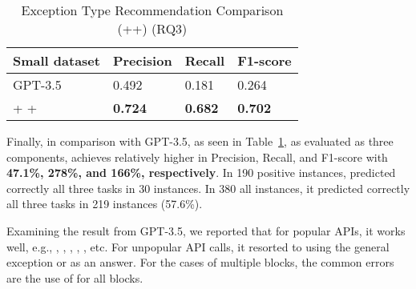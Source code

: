 \begin{table}[t]%
  \caption{Exception Type Recommendation Comparison (\xblock+\xstate+\xtype) (RQ3)}
  \vspace{-12pt}
  \small
	\begin{center}
		\renewcommand{\arraystretch}{1}
		\begin{tabular}{| p{3.10cm}<{\centering} | p{1.2cm}<{\centering} | p{1.2cm}<{\centering}| p{1.2cm}<{\centering}|}
		  \hline
			Small dataset  & Precision  & Recall & F1-score \\
			\hline
                        GPT-3.5 & 0.492 & 0.181 & 0.264 \\
			\hline
			\xblock + \xstate  + \xtype  & \textbf{0.724}  &  \textbf{0.682} & \textbf{0.702}\\
			\hline
		\end{tabular}
		\label{tab:xtype-2}
	\end{center}

\end{table}

Finally, in comparison with GPT-3.5, as seen in
Table~\ref{tab:xtype-2}, {\tool} as evaluated as three components,
achieves relatively higher in Precision, Recall, and F1-score with
{\bf 47.1\%, 278\%, and 166\%, respectively}. In 190 positive
instances, {\tool} predicted correctly all three tasks in 30
instances. In 380 all instances, it predicted correctly all
three tasks in 219 instances (57.6\%).

Examining the result from GPT-3.5, we reported that for popular APIs,
it works well, e.g., ,
, ,
, , etc. For
unpopular API calls, it resorted to using the general exception
 or  as an answer. For the cases of
multiple  blocks, the common errors are the use of
 for all blocks.

